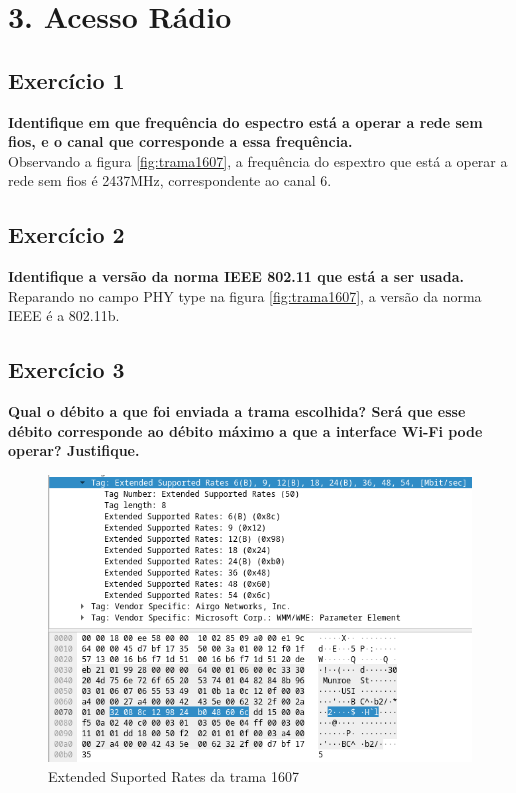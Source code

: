 \documentclass[a4paper]{report}
\begin{document}
\chapter{3. Acesso Rádio}
\section{Exercício 1}
\textbf{Identifique em que frequência do espectro está a operar a rede sem fios,
    e o canal que corresponde a essa frequência.}\\

Observando a figura \ref{fig:trama1607}, a frequência do espextro que está a
operar a rede sem fios é 2437MHz, correspondente ao canal 6.\\

\section{Exercício 2}
\textbf{Identifique a versão da norma IEEE 802.11 que está a ser usada.}\\

Reparando no campo PHY type na figura \ref{fig:trama1607}, a versão da norma
IEEE é a 802.11b.\\

\section{Exercício 3}
\textbf{Qual o débito a que foi enviada a trama escolhida? Será que esse débito
    corresponde ao débito máximo a que a interface Wi-Fi pode operar?
    Justifique.}\\

\begin{figure}[H]
    \centering 
    \includegraphics[width=\textwidth]{images/maxDataRateEx3.png}  
    \caption{Extended Suported Rates da trama 1607}
    \label{fig:maxDataRateEx3}
\end{figure}\\
\end{document}
